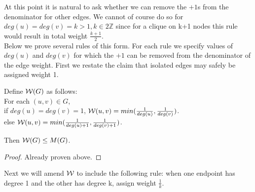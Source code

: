 At this point it is natural to ask whether we can remove the $+1$s from the denominator for other edges.  We cannot of course do so for $deg(u) = deg(v) = k >1, k \in 2\mathbb{Z}$ since for a clique on k+1 nodes this rule would result in total weight $\frac{k+1}{2}$.\\

Below we prove several rules of this form.  For each rule we specify values of $deg(u)$ and $deg(v)$ for which the $+1$ can be removed from the denominator of the edge weight.  First we restate the claim that isolated edges may safely be assigned weight 1.

\begin{lemma}
Define $\mathcal {W}(G)$ as follows:\\
For each $(u,v) \in G$,\\
if $deg(u) = deg(v) = 1$, $\mathcal {W}(u,v) =  min(\frac{1}{deg(u)},\frac{1}{deg(v)})$.\\
else $\mathcal {W}(u,v) =  min(\frac{1}{deg(u)+1},\frac{1}{deg(v)+1})$.

Then $\mathcal {W}(G) \leq M(G)$.

\end{lemma}
\begin{proof}
Already proven above.
\end{proof}

Next we will amend $\mathcal {W}$ to include the following rule: when one endpoint has degree 1 and the other has degree k, assign weight $\frac{1}{k}$.

